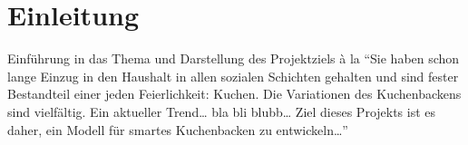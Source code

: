 \chapter{Einleitung}

Einführung in das Thema und Darstellung des Projektziels à la \enquote{Sie haben schon lange Einzug in den Haushalt in allen sozialen Schichten gehalten und sind fester Bestandteil einer jeden Feierlichkeit: Kuchen. Die Variationen des Kuchenbackens sind vielfältig. Ein aktueller Trend\dots{} bla bli blubb\dots{} Ziel dieses Projekts ist es daher, ein Modell für smartes Kuchenbacken zu entwickeln\dots{}}